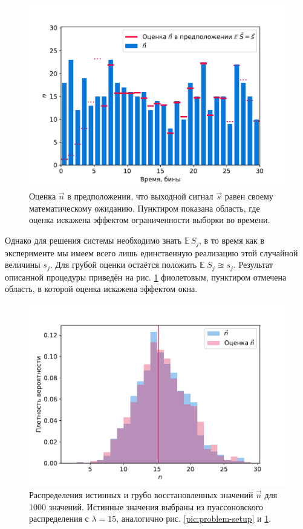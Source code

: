 \documentclass[12pt]{book}
\begin{document}
	\begin{figure}
		\centering
		\includegraphics[width=\columnwidth]{mean-estimation}
		\caption{Оценка $\vec{n}$ в предположении, что выходной сигнал $\vec{s}$ равен своему математическому ожиданию. Пунктиром показана область, где оценка искажена эффектом ограниченности выборки во времени.}
		\label{pic:mean-estimation}
	\end{figure}
	
	Однако для решения системы необходимо знать $\mathbb{E} \, S_j$, в то время как в эксперименте мы имеем всего лишь единственную реализацию этой случайной величины $s_j$. Для грубой оценки остаётся положить $\mathbb{E} \; S_j \approxeq s_j$. Результат описанной процедуры приведён на рис. \ref{pic:mean-estimation} фиолетовым, пунктиром отмечена область, в которой оценка искажена эффектом окна.
	
	\begin{figure}
		\centering
		\includegraphics[width=\columnwidth]{mean-estimation-assessment}
		\caption{Распределения истинных и грубо восстановленных значений $\vec{n}$ для 1000 значений. Истинные значения выбраны из пуассоновского распределения с $\lambda = 15$, аналогично рис. \ref{pic:problem-setup} и \ref{pic:mean-estimation}.}
		\label{pic:mean-estimation-assessment}
	\end{figure}
	
\end{document}
